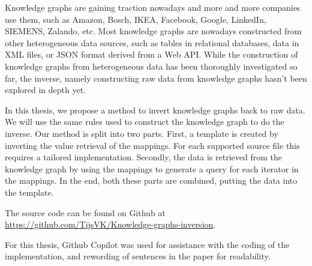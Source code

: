 Knowledge graphs are gaining traction nowadays and more and more companies use them, such as Amazon, Bosch, IKEA, Facebook, Google, LinkedIn, SIEMENS, Zalando, etc. Most knowledge graphs are nowadays constructed from other heterogeneous data sources, such as tables in relational databases, data in XML files, or JSON format derived from a Web API. While the construction of knowledge graphs from heterogeneous data has been thoroughly investigated so far, the inverse, namely constructing raw data from knowledge graphs hasn't been explored in depth yet. 

In this thesis, we propose a method to invert knowledge graphs back to raw data. We will use the same rules used to construct the knowledge graph to do the inverse. Our method is split into two parts. First, a template is created by inverting the value retrieval of the mappings. For each supported source file this requires a tailored implementation. Secondly, the data is retrieved from the knowledge graph by using the mappings to generate a query for each iterator in the mappings. In the end, both these parts are combined, putting the data into the template.

The source code can be found on Github at \href{https://github.com/TijsVK/Knowledge-graphs-inversion}{https://github.com/TijsVK/Knowledge-graphs-inversion}. 

For this thesis, Github Copilot was used for assistance with the coding of the implementation, and rewording of sentences in the paper for readability.

